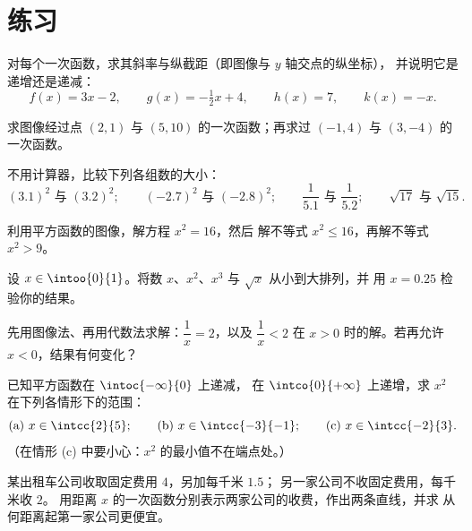 \section{练习}

\begin{exercise}[$\star$]\label{exo:g10:reffunc:1}
对每个一次函数，求其斜率与纵截距（即图像与 $y$ 轴交点的纵坐标），
并说明它是递增还是递减：
\[
f(x) = 3x - 2, \qquad
g(x) = -\tfrac12 x + 4, \qquad
h(x) = 7, \qquad
k(x) = -x .
\]
\end{exercise}

\begin{exercise}[$\star$]\label{exo:g10:reffunc:2}
求图像经过点 $(2, 1)$ 与
$(5, 10)$ 的一次函数；再求过 $(-1, 4)$ 与 $(3, -4)$ 的一次函数。
\end{exercise}

\begin{exercise}[$\star$]\label{exo:g10:reffunc:3}
不用计算器，比较下列各组数的大小：
\[
(3.1)^2 \text{ 与 } (3.2)^2; \qquad
(-2.7)^2 \text{ 与 } (-2.8)^2; \qquad
\frac{1}{5.1} \text{ 与 } \frac{1}{5.2}; \qquad
\sqrt{17} \text{ 与 } \sqrt{15}.
\]
\end{exercise}

\begin{exercise}[$\star$]\label{exo:g10:reffunc:4}
利用平方函数的图像，解方程 $x^2 = 16$，然后
解不等式 $x^2 \leq 16$，再解不等式 $x^2 > 9$。
\end{exercise}

\begin{exercise}[$\star$]\label{exo:g10:reffunc:5}
设 $x \in \intoo{0}{1}$。将数 $x$、$x^2$、$x^3$ 与
$\sqrt x$ 从小到大排列，并
用 $x = 0.25$ 检验你的结果。
\end{exercise}

\begin{exercise}[$\star\star$]\label{exo:g10:reffunc:6}
先用图像法、再用代数法求解：$\dfrac1x = 2$，以及
$\dfrac1x < 2$ 在 $x > 0$ 时的解。若再允许 $x < 0$，结果有何变化？
\end{exercise}

\begin{exercise}[$\star\star$]\label{exo:g10:reffunc:7}
已知平方函数在 $\intoc{-\infty}{0}$ 上递减，
在 $\intco{0}{+\infty}$ 上递增，求 $x^2$ 在下列各情形下的范围：
\[
\text{(a) } x \in \intcc{2}{5};
\qquad
\text{(b) } x \in \intcc{-3}{-1};
\qquad
\text{(c) } x \in \intcc{-2}{3}.
\]
（在情形 (c) 中要小心：$x^2$ 的最小值不在端点处。）
\end{exercise}

\begin{exercise}[$\star\star$]\label{exo:g10:reffunc:8}
某出租车公司收取固定费用 $4$，另加每千米 $1.5$；
另一家公司不收固定费用，每千米收 $2$。
用距离 $x$ 的一次函数分别表示两家公司的收费，作出两条直线，并求
从何距离起第一家公司更便宜。
\end{exercise}

